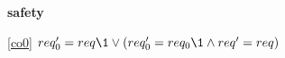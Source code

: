 \textbf{safety}
\begin{block}
\item[ \eqref{co0} ]{$req_0' = req \1\lor (req_0' = req_0 \1\land req' = req)$} %
\end{block}
